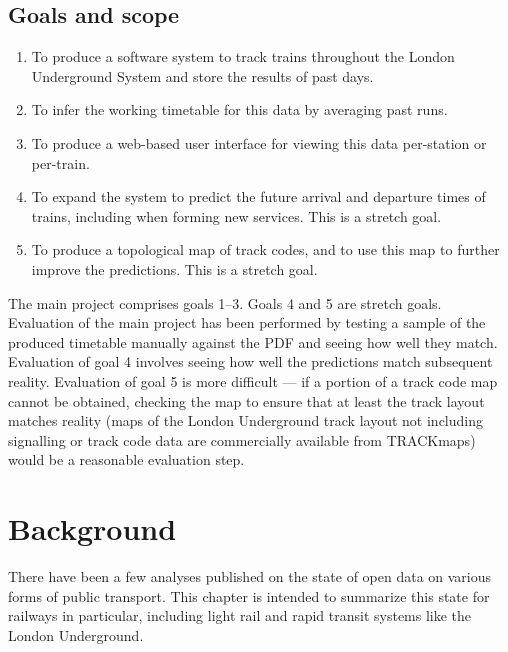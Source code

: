 \documentclass[a4paper,12pt]{report}
\begin{document}
\section{Goals and scope}

\begin{enumerate}
  \item To produce a software system to track trains throughout the London
    Underground System and store the results of past days.
  \item To infer the working timetable for this data by averaging past runs.
  \item To produce a web-based user interface for viewing this data per-station
    or per-train.
  \item To expand the system to predict the future arrival and departure times
    of trains, including when forming new services. This is a stretch goal.
  \item To produce a topological map of track codes, and to use this map to
    further improve the predictions. This is a stretch goal.
\end{enumerate}

The main project comprises goals 1--3. Goals 4 and 5 are stretch goals.
Evaluation of the main project has been performed by testing a sample of the
produced timetable manually against the PDF and seeing how well they match.
Evaluation of goal 4 involves seeing how well the predictions match subsequent
reality. Evaluation of goal 5 is more difficult --- if a portion of a track
code map cannot be obtained, checking the map to ensure that at least the track
layout matches reality (maps of the London Underground track layout not
including signalling or track code data are commercially available from
TRACKmaps\cite{TRACKmaps5}) would be a reasonable evaluation step.

\chapter{Background}

There have been a few analyses published on the state of open data on various
forms of public transport. This chapter is intended to summarize this state for
railways in particular, including light rail and rapid transit systems like the
London Underground.
\end{document}
